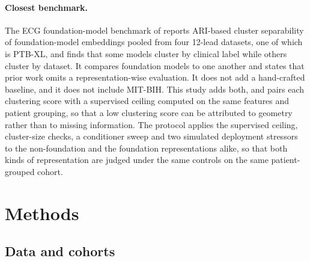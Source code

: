 \documentclass[preprint,11pt]{elsarticle}
\begin{document}
\paragraph{Closest benchmark.} The ECG foundation-model benchmark of
\cite{lookingbeyond2026} reports ARI-based cluster separability of foundation-model
embeddings pooled from four 12-lead datasets, one of which is PTB-XL, and finds that
some models cluster by clinical label while others cluster by dataset. It compares foundation models to one another and states that prior
work omits a representation-wise evaluation. It does not add a hand-crafted baseline,
and it does not include MIT-BIH. This study adds both, and pairs each clustering score
with a supervised ceiling computed on the same features and patient grouping, so that a
low clustering score can be attributed to geometry rather than to missing information.
The protocol applies the supervised ceiling, cluster-size checks, a conditioner sweep
and two simulated deployment stressors to the non-foundation and the foundation
representations alike, so that both kinds of representation are judged under the same
controls on the same patient-grouped cohort.

\section{Methods}\label{sec:methods}

\subsection{Data and cohorts}
\end{document}
